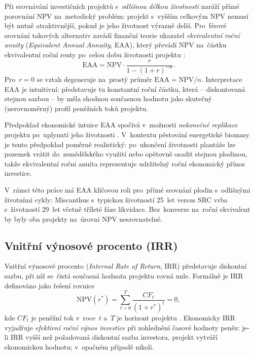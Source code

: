 Při srovnávání investičních projektů s~\textit{odlišnou délkou
životnosti} naráží přímé porovnání NPV na~metodický problém: projekt
s~vyšším celkovým NPV nemusí být nutně atraktivnější, pokud je
jeho životnost výrazně delší. Pro~férové srovnání takových alternativ
zavádí finanční teorie ukazatel \textit{ekvivalentní roční anuity}
(\textit{Equivalent Annual Annuity}, EAA), který převádí NPV na~částku
ekvivalentní roční renty po~celou dobu životnosti projektu
\citep{BrealeyMyers2020}:
\begin{equation}
    \text{EAA} = \text{NPV} \cdot \frac{r}{1 - (1+r)^{-n}}.
    \label{eq:eaa_theory}
\end{equation}
Pro~$r = 0$ se vztah degeneruje na~prostý průměr
$\text{EAA} = \text{NPV}/n$. Interpretace EAA je intuitivní:
představuje tu konstantní roční částku, která -- diskontovaná stejnou
sazbou -- by měla shodnou současnou hodnotu jako skutečný (nerovnoměrný)
profil peněžních toků projektu.

Předpoklad ekonomické intuice EAA spočívá v~možnosti
\textit{nekonečné replikace} projektu po~uplynutí jeho životnosti
\citep{BrealeyMyers2020}. V~kontextu pěstování energetické biomasy
je tento předpoklad poměrně realistický: po~ukončení životnosti
plantáže lze pozemek vrátit do~zemědělského využití nebo opětovně
osadit stejnou plodinou, takže ekvivalentní roční anuita reprezentuje
udržitelný roční ekonomický přínos investice.

V~rámci této práce má EAA klíčovou roli pro~přímé srovnání plodin
s~odlišnými životními cykly: Miscanthus s~typickou životností 25~let
versus SRC vrba s~životností 29~let včetně tříleté fáze likvidace.
Bez~konverze na~roční ekvivalent by byly oba projekty na~úrovni NPV
nesrovnatelné.

\subsection{Vnitřní výnosové procento (IRR)}
\label{subsec:irr}

Vnitřní výnosové procento (\textit{Internal Rate of Return}, IRR)
představuje diskontní sazbu, při níž se~čistá současná hodnota projektu
rovná nule. Formálně je IRR definováno jako řešení rovnice
\begin{equation}
    \mathrm{NPV}(r^*) = \sum_{t=0}^{T} \frac{CF_t}{(1+r^*)^t} = 0,
    \label{eq:irr}
\end{equation}
kde $CF_t$ je peněžní tok v~roce~$t$ a~$T$ je horizont projektu
\citep{BrealeyMyers2020}. Ekonomicky IRR vyjadřuje \emph{efektivní
roční výnos investice} při zohlednění časové hodnoty peněz: je-li
IRR vyšší než požadovaná diskontní sazba investora, projekt vytváří
ekonomickou hodnotu; v~opačném případě nikoli.

